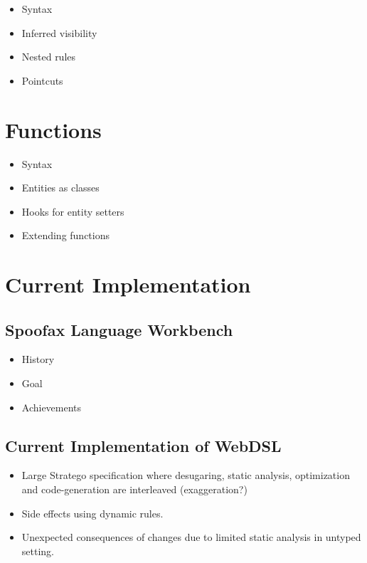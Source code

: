     \begin{itemize}
      \item Syntax
      \item Inferred visibility
      \item Nested rules
      \item Pointcuts
    \end{itemize}

  \section{\label{sec:functions}Functions}

    \begin{itemize}
      \item Syntax
      \item Entities as classes
      \item Hooks for entity setters
      \item Extending functions
    \end{itemize}

  \section{\label{sec:current-implementation}Current Implementation}

    \subsection{\label{subsec:spoofax}Spoofax Language Workbench}

      \begin{itemize}
        \item History
        \item Goal
        \item Achievements
      \end{itemize}

    \subsection{\label{subsec:current-implementation}Current Implementation of WebDSL}

      \begin{itemize}
        \item Large Stratego specification where desugaring, static analysis, optimization and code-generation are interleaved (exaggeration?)
        \item Side effects using dynamic rules.
        \item Unexpected consequences of changes due to limited static analysis in untyped setting.
      \end{itemize}


